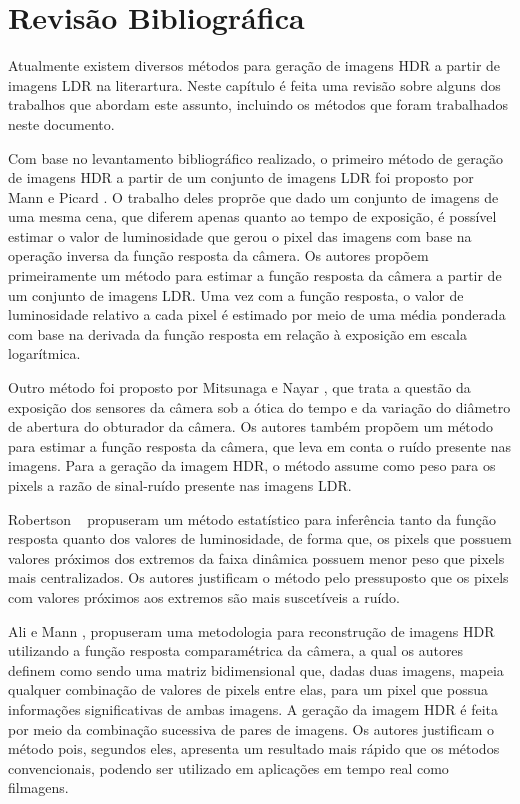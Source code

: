 \section{Revisão Bibliográfica} \label{revisaoHDR}
Atualmente existem diversos métodos para geração de imagens HDR a partir de imagens LDR na literartura. Neste capítulo é feita uma revisão sobre alguns dos trabalhos que abordam este assunto, incluindo os métodos que foram trabalhados neste documento.


Com base no levantamento bibliográfico realizado, o primeiro método de geração de imagens HDR a partir de um conjunto de imagens LDR foi proposto por Mann e Picard \cite{mann}. O trabalho deles proprõe que dado um conjunto de imagens de uma mesma cena, que diferem apenas quanto ao tempo de exposição, é possível estimar o valor de luminosidade que gerou o pixel das imagens com base na operação inversa da função resposta da câmera. Os autores propõem primeiramente um método para estimar a função resposta da câmera a partir de um conjunto de imagens LDR. Uma vez com a função resposta, o valor de luminosidade relativo a cada pixel é estimado por meio de uma média ponderada com base na derivada da função resposta em relação à exposição em escala logarítmica.


Outro método foi proposto por Mitsunaga e Nayar \cite{mitsunaga}, que trata a questão da exposição dos sensores da câmera sob a ótica do tempo e da variação do diâmetro de abertura do obturador da câmera. Os autores também propõem um método para estimar a função resposta da câmera, que leva em conta o ruído presente nas imagens. Para a geração da imagem HDR, o método assume como peso para os pixels a razão de sinal-ruído presente nas imagens LDR.


Robertson \etal~\cite{robertson} propuseram um método estatístico para inferência tanto da função resposta quanto dos valores de luminosidade, de forma que, os pixels que possuem valores próximos dos extremos da faixa dinâmica possuem menor peso que pixels mais centralizados. Os autores justificam o método pelo pressuposto que os pixels com valores próximos aos extremos são mais suscetíveis a ruído.


Ali e Mann \cite{ali}, propuseram uma metodologia para reconstrução de imagens HDR utilizando a função resposta comparamétrica da câmera, a qual os autores definem como sendo uma matriz bidimensional que, dadas duas imagens, mapeia qualquer combinação de valores de pixels entre elas, para um pixel que possua informações significativas de ambas imagens. A geração da imagem HDR é feita por meio da combinação sucessiva de pares de imagens. Os autores justificam o método pois, segundos eles, apresenta um resultado mais rápido que os métodos convencionais, podendo ser utilizado em aplicações em tempo real como filmagens.


